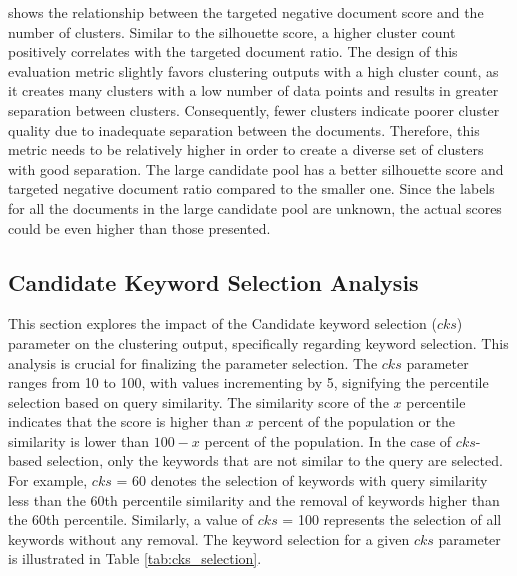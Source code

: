 
 
 shows the relationship between the targeted negative document score and the number of clusters. Similar to the silhouette score, a higher cluster count positively correlates with the targeted document ratio. The design of this evaluation metric slightly favors clustering outputs with a high cluster count, as it creates many clusters with a low number of data points and results in greater separation between clusters. Consequently, fewer clusters indicate poorer cluster quality due to inadequate separation between the documents. Therefore, this metric needs to be relatively higher in order to create a diverse set of clusters with good separation. The large candidate pool has a better silhouette score and targeted negative document ratio compared to the smaller one. Since the labels for all the documents in the large candidate pool are unknown, the actual scores could be even higher than those presented.

\subsection{Candidate Keyword Selection Analysis}
This section explores the impact of the Candidate keyword selection ($cks$) parameter on the clustering output, specifically regarding keyword selection. This analysis is crucial for finalizing the parameter selection. The $cks$ parameter ranges from 10 to 100, with values incrementing by 5, signifying the percentile selection based on query similarity. The similarity score of the $x$ percentile indicates that the score is higher than $x$ percent of the population or the similarity is lower than $100-x$ percent of the population. In the case of $cks$-based selection, only the keywords that are not similar to the query are selected. For example, $cks$ = 60 denotes the selection of keywords with query similarity less than the 60th percentile similarity and the removal of keywords higher than the 60th percentile. Similarly, a value of $cks$ = 100 represents the selection of all keywords without any removal. The keyword selection for a given $cks$ parameter is illustrated in Table \ref{tab:cks_selection}.

